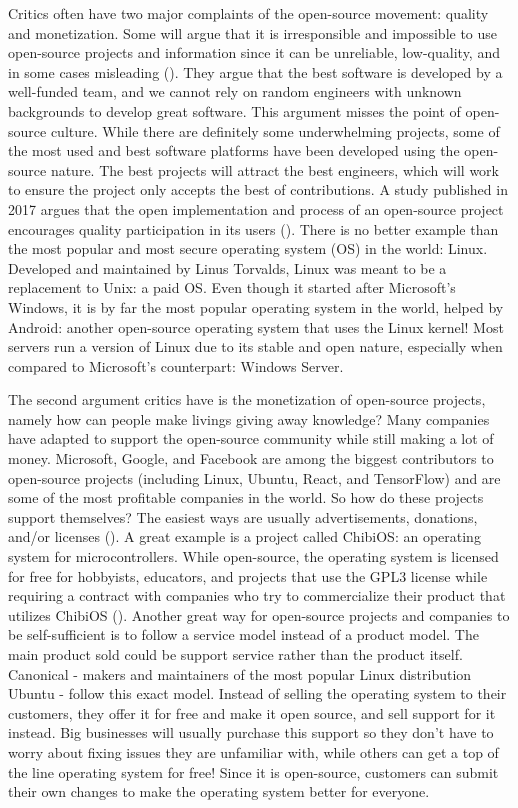 Critics often have two major complaints of the open-source movement: quality and monetization. Some will argue that it is irresponsible and impossible to use open-source projects and information since it can be unreliable, low-quality, and in some cases misleading (\cite{OpenSourceFail}). They argue that the best software is developed by a well-funded team, and we cannot rely on random engineers with unknown backgrounds to develop great software. This argument misses the point of open-source culture. While there are definitely some underwhelming projects, some of the most used and best software platforms have been developed using the open-source nature. The best projects will attract the best engineers, which will work to ensure the project only accepts the best of contributions. A study published in 2017 argues that the open implementation and process of an open-source project encourages quality participation in its users (\cite{OpenSource_Good}). There is no better example than the most popular and most secure operating system (OS) in the world: Linux. Developed and maintained by Linus Torvalds, Linux was meant to be a replacement to Unix: a paid OS. Even though it started after Microsoft's Windows, it is by far the most popular operating system in the world, helped by Android: another open-source operating system that uses the Linux kernel! Most servers run a version of Linux due to its stable and open nature, especially when compared to Microsoft's counterpart: Windows Server.

The second argument critics have is the monetization of open-source projects, namely how can people make livings giving away knowledge? Many companies have adapted to support the open-source community while still making a lot of money. Microsoft, Google, and Facebook are among the biggest contributors to open-source projects (including Linux, Ubuntu, React, and TensorFlow) and are some of the most profitable companies in the world. So how do these projects support themselves? The easiest ways are usually advertisements, donations, and/or licenses (\cite{OpenSouceMakeMoney}). A great example is a project called ChibiOS: an operating system for microcontrollers. While open-source, the operating system is licensed for free for hobbyists, educators, and projects that use the GPL3 license while requiring a contract with companies who try to commercialize their product that utilizes ChibiOS (\cite{ChibiOS}). Another great way for open-source projects and companies to be self-sufficient is to follow a service model instead of a product model. The main product sold could be support service rather than the product itself. Canonical - makers and maintainers of the most popular Linux distribution Ubuntu - follow this exact model. Instead of selling the operating system to their customers, they offer it for free and make it open source, and sell support for it instead. Big businesses will usually purchase this support so they don't have to worry about fixing issues they are unfamiliar with, while others can get a top of the line operating system for free! Since it is open-source, customers can submit their own changes to make the operating system better for everyone. 

